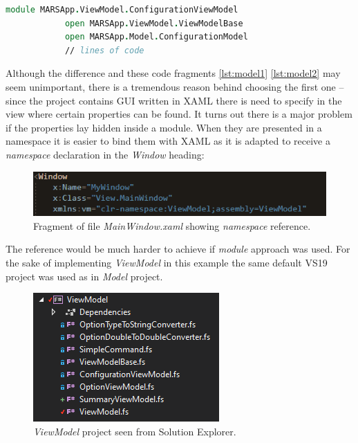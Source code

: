         \begin{lstlisting}[language=FSharp, label={lst:model2}, caption=F\# alternative example \textit{ViewModel} project component beginning.]
            module MARSApp.ViewModel.ConfigurationViewModel
            open MARSApp.ViewModel.ViewModelBase
            open MARSApp.Model.ConfigurationModel
            // lines of code
        \end{lstlisting}
        
        Although the difference and these code fragments \ref{lst:model1} \ref{lst:model2} may seem unimportant, there is a tremendous reason behind choosing the first one -- since the project contains GUI written in XAML there is need to specify in the view where certain properties can be found. It turns out there is a major problem if the properties lay hidden inside a module. When they are presented in a namespace it is easier to bind them with XAML as it is adapted to receive a \textit{namespace} declaration in the \textit{Window} heading:
        
        \begin{figure}[H]
            \centering
            \includegraphics{img/viewmodel_namespace.png}
            \caption{Fragment of file \textit{MainWindow.xaml} showing \textit{namespace} reference.}
            \label{fig:viewmodel_namespace}
        \end{figure}
        The reference would be much harder to achieve if \textit{module} approach was used.
        For the sake of implementing \textit{ViewModel} in this example the same default VS19 project was used as in \textit{Model} project.
        
        \begin{figure}[H]
            \centering
            \includegraphics{img/viewmodel.png}
            \caption{\textit{ViewModel} project seen from Solution Explorer.}
            \label{fig:viewmodel}
        \end{figure} 
    

